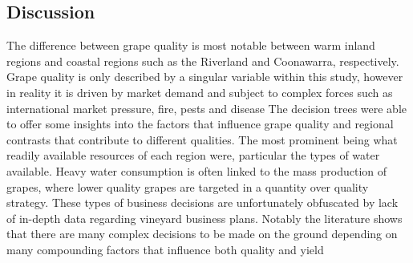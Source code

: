 \documentclass[review,12pt,authoryear]{elsarticle}
\begin{document}
\begin{linenumbers}
\section{Discussion}
The difference between grape quality is most notable between warm inland regions and coastal regions such as the Riverland and Coonawarra, respectively. Grape quality is only described by a singular variable within this study, however in reality it is driven by market demand and subject to  complex forces such as international market pressure, fire, pests and disease \citep{wineaustraliaNationalVintageReport2019,wineaustraliaNationalVintageReport2020,wineaustraliaNationalVintageReport2021,wineaustraliaNationalVintageReport2022,winemakersfederationofaustraliaNationalVintageReport2015,winemakersfederationofaustraliaNationalVintageReport2016,winemakersfederationofaustraliaNationalVintageReport2017,winemakersfederationofaustraliaNationalVintageReport2018} %
The decision trees were able to offer some insights into the factors that influence grape quality and regional contrasts that contribute to different qualities. The most prominent being what readily available resources of each region were, particular the types of water available. %
 Heavy water consumption is often linked to the mass production of grapes, %
 where lower quality grapes are targeted in a quantity over quality strategy. These types of business decisions are unfortunately obfuscated by lack of in-depth data regarding vineyard business plans. 
 Notably the literature shows that there are many complex decisions to be made on the ground depending on many compounding factors that influence both quality and yield \citep{abadCoverCropsViticulture2021,cortezUsingDataMining2009,hallWithinseasonTemporalVariation2011,i.goodwinManagingSoilWater2009,kasimatiPredictingGrapeSugar2022,oliverReviewSoilPhysical2013,srivastavaNondestructiveSensingMethods2018}

\end{linenumbers}
\end{document}

